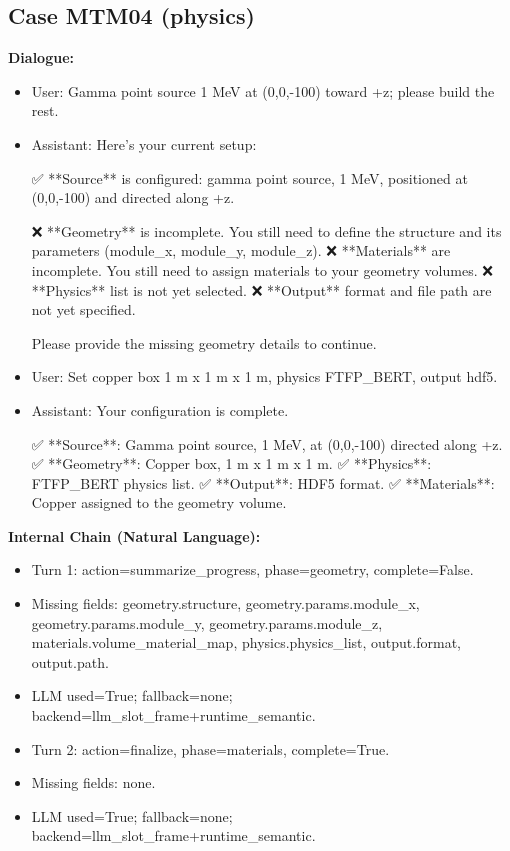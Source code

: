\documentclass[11pt]{ctexart}
\begin{document}
\subsection{Case MTM04 (physics)}
\textbf{Dialogue:}
\begin{itemize}
\item User: Gamma point source 1 MeV at (0,0,-100) toward +z; please build the rest.
\item Assistant: Here's your current setup:

✅ **Source** is configured: gamma point source, 1 MeV, positioned at (0,0,-100) and directed along +z.

❌ **Geometry** is incomplete. You still need to define the structure and its parameters (module\_x, module\_y, module\_z).
❌ **Materials** are incomplete. You still need to assign materials to your geometry volumes.
❌ **Physics** list is not yet selected.
❌ **Output** format and file path are not yet specified.

Please provide the missing geometry details to continue.
\item User: Set copper box 1 m x 1 m x 1 m, physics FTFP\_BERT, output hdf5.
\item Assistant: Your configuration is complete.

✅ **Source**: Gamma point source, 1 MeV, at (0,0,-100) directed along +z.
✅ **Geometry**: Copper box, 1 m x 1 m x 1 m.
✅ **Physics**: FTFP\_BERT physics list.
✅ **Output**: HDF5 format.
✅ **Materials**: Copper assigned to the geometry volume.
\end{itemize}
\textbf{Internal Chain (Natural Language):}
\begin{itemize}
\item Turn 1: action=summarize\_progress, phase=geometry, complete=False.
\item Missing fields: geometry.structure, geometry.params.module\_x, geometry.params.module\_y, geometry.params.module\_z, materials.volume\_material\_map, physics.physics\_list, output.format, output.path.
\item LLM used=True; fallback=none; backend=llm\_slot\_frame+runtime\_semantic.
\item Turn 2: action=finalize, phase=materials, complete=True.
\item Missing fields: none.
\item LLM used=True; fallback=none; backend=llm\_slot\_frame+runtime\_semantic.
\end{itemize}
\end{document}
